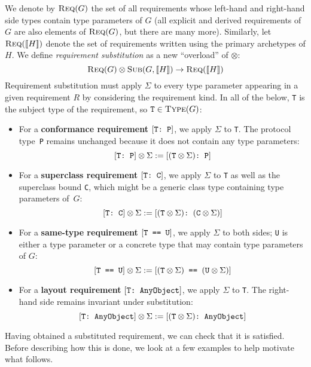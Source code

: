 \documentclass[../generics]{subfiles}
\begin{document}
\begin{definition}
We denote by $\textsc{Req}({G})$ the set of all requirements whose left-hand and right-hand side types contain type parameters of $G$ (all explicit and derived requirements of $G$ are also elements of $\textsc{Req}({G})$, but there are many more). Similarly, let $\textsc{Req}({[\![H]\!]})$ denote the set of requirements written using the primary archetypes of $H$. We define \emph{requirement substitution} as a new ``overload'' of \index{$\otimes$}$\otimes$:
\[\textsc{Req}({G})\otimes\textsc{Sub}({G, [\![H]\!]})\rightarrow\textsc{Req}({[\![H]\!]})\]
Requirement substitution must apply $\Sigma$ to every type parameter appearing in a given requirement $R$ by considering the requirement kind. In all of the below, \texttt{T} is the subject type of the requirement, so $\texttt{T}\in\textsc{Type}({G})$:
\begin{itemize}
\item For a \textbf{conformance requirement} $[\texttt{T:~P}]$, we apply $\Sigma$ to \texttt{T}. The protocol type~\texttt{P} remains unchanged because it does not contain any type parameters:
\[[\texttt{T:~P}]\otimes\Sigma:=[\texttt{$(\texttt{T}\otimes\Sigma)$:~P}]\]

\item For a \textbf{superclass requirement} $[\texttt{T:~C}]$, we apply $\Sigma$ to \texttt{T} as well as the superclass bound \texttt{C}, which might be a generic class type containing type parameters of~$G$:
\[[\texttt{T:~C}]\otimes\Sigma:=[\texttt{$(\texttt{T}\otimes\Sigma)$:~$(\texttt{C}\otimes\Sigma)$}]\]

\item For a \textbf{same-type requirement} $[\texttt{T == U}]$, we apply $\Sigma$ to both sides; \texttt{U} is either a type parameter or a concrete type that may contain type parameters of $G$:
\[[\texttt{T == U}]\otimes\Sigma:=[\texttt{$(\texttt{T}\otimes\Sigma)$ == $(\texttt{U}\otimes\Sigma)$}]\]

\item For a \textbf{layout requirement} $[\texttt{T:~AnyObject}]$, we apply $\Sigma$ to \texttt{T}. The right-hand side remains invariant under substitution:
\[[\texttt{T:~AnyObject}]\otimes\Sigma:=[\texttt{$(\texttt{T}\otimes\Sigma)$:~AnyObject}]\]
\end{itemize}
Having obtained a substituted requirement, we can check that it is satisfied. Before describing how this is done, we look at a few examples to help motivate what follows.
\end{definition}
\end{document}

